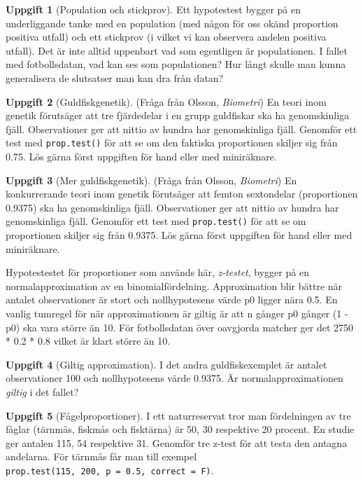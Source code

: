 \documentclass[
]{book}
\theoremstyle{definition}
\theoremstyle{definition}
\theoremstyle{definition}
\newtheorem{exercise}{Uppgift}[chapter]
\theoremstyle{definition}
\theoremstyle{remark}
\begin{document}
\begin{exercise}[Population och stickprov]
Ett hypotestest bygger på en underliggande tanke med en population (med någon för oss okänd proportion positiva utfall) och ett stickprov (i vilket vi kan observera andelen positiva utfall). Det är inte alltid uppenbart vad som egentligen är populationen. I fallet med fotbollsdatan, vad kan ses som populationen? Hur långt skulle man kunna generalisera de slutsatser man kan dra från datan?
\end{exercise}

\begin{exercise}[Guldfiskgenetik]
(Fråga från Olsson, \emph{Biometri}) En teori inom genetik förutsäger att tre fjärdedelar i en grupp guldfiskar ska ha genomskinliga fjäll. Observationer ger att nittio av hundra har genomskinliga fjäll. Genomför ett test med \texttt{prop.test()} för att se om den faktiska proportionen skiljer sig från 0.75. Lös gärna först uppgiften för hand eller med miniräknare.
\end{exercise}

\begin{exercise}[Mer guldfiskgenetik]
(Fråga från Olsson, \emph{Biometri}) En konkurrerande teori inom genetik förutsäger att femton sextondelar (proportionen 0.9375) ska ha genomskinliga fjäll. Observationer ger att nittio av hundra har genomskinliga fjäll. Genomför ett test med \texttt{prop.test()} för att se om proportionen skiljer sig från 0.9375. Lös gärna först uppgiften för hand eller med miniräknare.
\end{exercise}

Hypotestestet för proportioner som används här, \emph{z-testet}, bygger på en normalapproximation av en binomialfördelning. Approximation blir bättre när antalet observationer är stort och nollhypotesens värde p0 ligger nära 0.5. En vanlig tumregel för när approximationen är giltig är att n gånger p0 gånger (1 - p0) ska vara större än 10. För fotbollsdatan över oavgjorda matcher ger det 2750 * 0.2 * 0.8 vilket är klart större än 10.

\begin{exercise}[Giltig approximation]
I det andra guldfiskexemplet är antalet observationer 100 och nollhypotesens värde 0.9375. Är normalapproximationen \emph{giltig} i det fallet?
\end{exercise}

\begin{exercise}[Fågelproportioner]
I ett naturreservat tror man fördelningen av tre fåglar (tärnmås, fiskmås och fisktärna) är 50, 30 respektive 20 procent. En studie ger antalen 115, 54 respektive 31. Genomför tre z-test för att testa den antagna andelarna. För tärnmås får man till exempel \texttt{prop.test(115,\ 200,\ p\ =\ 0.5,\ correct\ =\ F)}.
\end{exercise}
\end{document}
